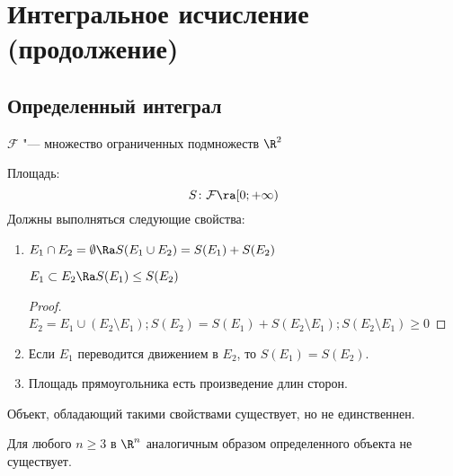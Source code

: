 \chapter{Интегральное исчисление (продолжение)}
\section{Определенный интеграл}

\begin{Def}
	$\mathcal{F}$ "--- множество ограниченных подмножеств $\R^2$
\end{Def}

\begin{Def}
	Площадь:
	\[ S\colon \mathcal{F} \ra [0; +\infty) \]
	Должны выполняться следующие свойства:

	\begin{enumerate}
	\item
		$E_1 \cap E_2 = \emptyset \Ra S(E_1 \cup E_2) = S(E_1) + S(E_2)$
		\begin{conseq*}
			$E_1 \subset E_2 \Ra S(E_1) \le S(E_2)$
		\end{conseq*}
		\begin{proof}
			$E_2 = E_1 \cup (E_2 \setminus E_1); S(E_2) = S(E_1) + S(E_2 \setminus E_1); S(E_2 \setminus E_1) \ge 0$
		\end{proof}

	\item
		Если $E_1$ переводится движением в $E_2$, то $S(E_1) = S(E_2)$.

	\item
		Площадь прямоугольника есть произведение длин сторон.
	\end{enumerate}
\end{Def}

\begin{theorem}
	Объект, обладающий такими свойствами существует, но не единственнен.
\end{theorem}

\begin{theorem}[Хаусдорфа]
	Для любого $n \ge 3$ в $\R^n$ аналогичным образом определенного объекта не существует.
\end{theorem}

